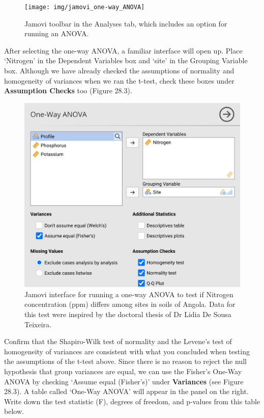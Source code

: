 \documentclass[
]{scrbook}
\begin{document}
\begin{figure}
\texttt{[image: img/jamovi\_one-way\_ANOVA]} \caption{Jamovi toolbar in the Analyses tab, which includes an option for running an ANOVA.}\label{fig:unnamed-chunk-127}
\end{figure}

After selecting the one-way ANOVA, a familiar interface will open up.
Place `Nitrogen' in the Dependent Variables box and `site' in the Grouping Variable box.
Although we have already checked the assumptions of normality and homogeneity of variances when we ran the t-test, check these boxes under \textbf{Assumption Checks} too (Figure 28.3).

\begin{figure}
\includegraphics[width=1\linewidth]{img/jamovi_one-way_ANOVA_analysis} \caption{Jamovi interface for running a one-way ANOVA to test if Nitrogen concentration (ppm) differs among sites in soils of Angola. Data for this test were inspired by the doctoral thesis of Dr Lidia De Sousa Teixeira.}\label{fig:unnamed-chunk-128}
\end{figure}

Confirm that the Shapiro-Wilk test of normality and the Levene's test of homogeneity of variances are consistent with what you concluded when testing the assumptions of the t-test above.
Since there is no reason to reject the null hypothesis that group variances are equal, we can use the Fisher's One-Way ANOVA by checking `Assume equal (Fisher's)' under \textbf{Variances} (see Figure 28.3).
A table called `One-Way ANOVA' will appear in the panel on the right.
Write down the test statistic (F), degrees of freedom, and p-values from this table below.
\end{document}
